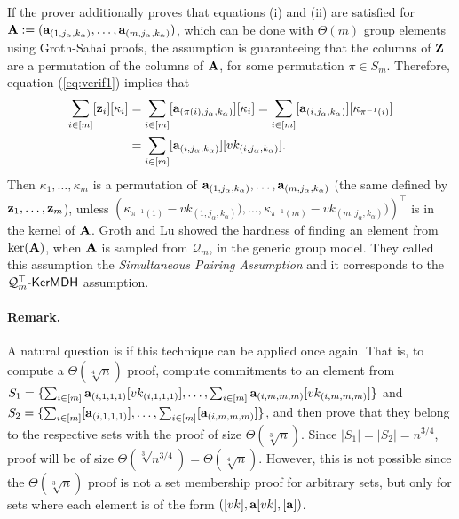 If the prover additionally proves that equations (i) and (ii) are satisfied for $\mathbf{{A}}:=(\mathbf{a}_{(1,j_\alpha,k_\alpha)},\ldots,\mathbf{a}_{(m,j_\alpha,k_\alpha)})$, which can be done with $\Theta(m)$ group elements using Groth-Sahai proofs, the assumption is guaranteeing that the columns of $\mathbf{{Z}}$ are a permutation of the columns of $\mathbf{{A}}$, for some permutation $\pi\in S_m$. Therefore, equation (\ref{eq:verif1}) implies that
\begin{align*}
\sum_{i\in[m]}[\mathbf{z}_i][\kappa_i]&=\sum_{i\in[m]}[\mathbf{a}_{(\pi(i),j_\alpha,k_\alpha)}][\kappa_i]=\sum_{i\in[m]}[\mathbf{a}_{(i,j_\alpha,k_\alpha)}][\kappa_{\pi^{-1}(i)}]\\
&=\sum_{i\in[m]}[\mathbf{a}_{(i,j_\alpha,k_\alpha)}][vk_{(i,j_\alpha,k_\alpha)}].
\end{align*}
Then $\kappa_1,\ldots,\kappa_m$ is a permutation of $\mathbf{a}_{(1,j_\alpha,k_\alpha)},\ldots,\mathbf{a}_{(m,j_\alpha,k_\alpha)}$ (the same defined by $\mathbf{z}_1,\ldots,\mathbf{z}_m$), unless $(\kappa_{\pi^{-1}(1)}-{vk_{(1,j_\alpha,k_\alpha)}),\ldots,\kappa_{\pi^{-1}(m)}-vk_{(m,j_\alpha,k_\alpha)})})^\top$ is in the kernel of $\mathbf{{A}}$. Groth and Lu showed the hardness of finding an element from $\ker(\mathbf{{A}})$, when $\mathbf{{A}}$ is sampled from $\mathcal{Q}_m$, in the generic group model. They called this assumption the \emph{Simultaneous Pairing Assumption} and it corresponds to the $\mathcal{Q}_m^\top\mbox{-}\mathsf{KerMDH}$ assumption.


\paragraph{Remark.}
A natural question is if this technique can be applied once again. That is, to compute a $\Theta(\sqrt[4]{n})$  proof, compute commitments to an element from $S_1=\{\sum_{i\in[m]}\mathbf{a}_{(i,1,1,1)}[vk_{(i,1,1,1)}],\ldots,\sum_{i\in[m]}\mathbf{a}_{(i,m,m,m)}[vk_{(i,m,m,m)}]\}$ and $S_2=\allowbreak\{\sum_{i\in[m]}[\mathbf{a}_{(i,1,1,1)}],\ldots,\sum_{i\in[m]}[\mathbf{a}_{(i,m,m,m)}]\}$, and then prove that they belong to the respective sets with the proof of size $\Theta(\sqrt[3]{n})$. Since $|S_1|=|S_2|=n^{3/4}$, proof will be of size $\Theta(\sqrt[3]{n^{3/4}})=\Theta(\sqrt[4]{n})$. However, this is not possible since the $\Theta(\sqrt[3]{n})$ proof is not a set membership proof for arbitrary sets, but only for sets where each element is of the form $([vk],\mathbf{a}[vk],[\mathbf{a}])$.

